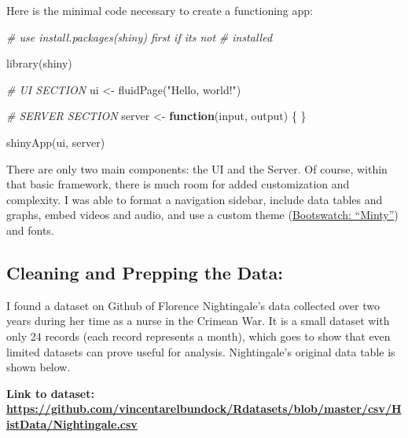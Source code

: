 \documentclass[
  dvipsnames]{article}
\newenvironment{Shaded}{\begin{snugshade}}{\end{snugshade}}
\newcommand{\CommentTok}[1]{\textcolor[rgb]{0.56,0.35,0.01}{\textit{#1}}}
\newcommand{\ControlFlowTok}[1]{\textcolor[rgb]{0.13,0.29,0.53}{\textbf{#1}}}
\newcommand{\FunctionTok}[1]{\textcolor[rgb]{0.00,0.00,0.00}{#1}}
\newcommand{\NormalTok}[1]{#1}
\newcommand{\OtherTok}[1]{\textcolor[rgb]{0.56,0.35,0.01}{#1}}
\newcommand{\StringTok}[1]{\textcolor[rgb]{0.31,0.60,0.02}{#1}}
\begin{document}
Here is the minimal code necessary to create a functioning app:

\begin{Shaded}
\begin{Highlighting}[]
\CommentTok{\# use install.packages(\textquotesingle{}shiny\textquotesingle{}) first if it\textquotesingle{}s not}
\CommentTok{\# installed}

\FunctionTok{library}\NormalTok{(shiny)}

\CommentTok{\# UI SECTION}
\NormalTok{ui }\OtherTok{\textless{}{-}} \FunctionTok{fluidPage}\NormalTok{(}\StringTok{"Hello, world!"}\NormalTok{)}

\CommentTok{\# SERVER SECTION}
\NormalTok{server }\OtherTok{\textless{}{-}} \ControlFlowTok{function}\NormalTok{(input, output) \{}
\NormalTok{\}}

\FunctionTok{shinyApp}\NormalTok{(ui, server)}
\end{Highlighting}
\end{Shaded}

There are only two main components: the UI and the Server. Of course,
within that basic framework, there is much room for added customization
and complexity. I was able to format a navigation sidebar, include data
tables and graphs, embed videos and audio, and use a custom theme
(\href{https://bootswatch.com/minty/}{Bootswatch: ``Minty''}) and fonts.

\hypertarget{section-6}{%
\subsection{\texorpdfstring{\textcolor{TealBlue}{Cleaning and Prepping the Data:}}{}}\label{section-6}}

I found a dataset on Github of Florence Nightingale's data collected
over two years during her time as a nurse in the Crimean War. It is a
small dataset with only 24 records (each record represents a month),
which goes to show that even limited datasets can prove useful for
analysis. Nightingale's original data table is shown below.

\textbf{Link to dataset:
\url{https://github.com/vincentarelbundock/Rdatasets/blob/master/csv/HistData/Nightingale.csv}}
\end{document}
